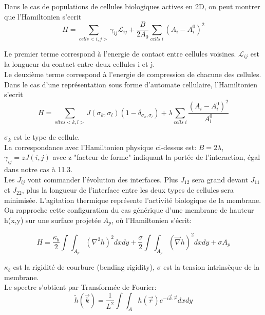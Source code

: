 \documentclass[11pt,a4paper]{article}
\begin{document}
Dans le cas de populations de cellules biologiques actives en 2D, on peut montrer que l'Hamiltonien s'ecrit
\begin{equation}
H = \sum_{cells<i,j>} \gamma_{ij} \mathcal{L}_{ij} + \frac{B}{2A_0}\sum_{cells\;i}(A_i - A_i^0)^{2}
\end{equation}

Le premier terme correspond à l'energie de contact entre cellules voisines. $\mathcal{L}_{ij}$ est la longueur du contact entre deux cellules i et j.\\
Le deuxième terme correspond à l'energie de compression de chacune des cellules.\\



Dans le cas d'une représentation sous forme d'automate cellulaire, l'Hamiltonien s'ecrit 
\begin{equation}
H = \sum_{sites<k,l>} J(\sigma_k,\sigma_l)(1-\delta_{\sigma_k,\sigma_l}) + \lambda \sum_{cells\;i} \frac{(A_i - A_i^0)^{2}}{A_i^0}
\end{equation}

$\sigma_k$ est le type de cellule.\\

La correspondance avec l'Hamiltonien physique ci-dessus est:
$B=2\lambda$, 
$\gamma_{ij}=zJ(i,j)$ avec z "facteur de forme" indiquant la portée de l'interaction, égal dans notre cas à 11.3.\\

Les $J_{ij}$ vont commander l'évolution des interfaces. Plus $J_{12}$ sera grand devant $J_{11}$ et $J_{22}$, plus la longueur de l'interface entre les deux types de cellules sera minimisée. L'agitation thermique représente l'activité biologique de la membrane.\\


On rapproche cette configuration du cas générique d'une membrane de hauteur h(x,y) sur une surface projetée $A_p$, où l'Hamiltonien s'écrit:

\begin{equation}
H = \frac{\kappa_b}{2} \int \int_{A_p} (\nabla^{2} h)^{2} dx dy + \frac{\sigma}{2} \int \int_{A_p} (\overrightarrow{\nabla} h)^{2} dx dy  + \sigma A_p
\end{equation}

$\kappa_b$ est la rigidité de courbure (bending rigidity), $\sigma$ est la tension intrinsèque de la membrane.\\

Le spectre s'obtient par Transformée de Fourier:
\begin{equation}
\tilde{h}(\overrightarrow{k}) = \frac{1}{L^{2}} \int \int_A h(\overrightarrow{r})e^{-i\overrightarrow{k}.\overrightarrow{r}} dx dy 
\end{equation}
\end{document}
